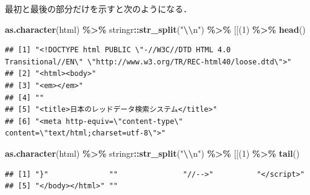 \documentclass[
]{article}
\newenvironment{Shaded}{\begin{snugshade}}{\end{snugshade}}
\newcommand{\AttributeTok}[1]{\textcolor[rgb]{0.13,0.29,0.53}{#1}}
\newcommand{\DecValTok}[1]{\textcolor[rgb]{0.00,0.00,0.81}{#1}}
\newcommand{\FunctionTok}[1]{\textcolor[rgb]{0.13,0.29,0.53}{\textbf{#1}}}
\newcommand{\NormalTok}[1]{#1}
\newcommand{\SpecialCharTok}[1]{\textcolor[rgb]{0.81,0.36,0.00}{\textbf{#1}}}
\newcommand{\StringTok}[1]{\textcolor[rgb]{0.31,0.60,0.02}{#1}}
\begin{document}
最初と最後の部分だけを示すと次のようになる．

\begin{Shaded}
\begin{Highlighting}[]
\FunctionTok{as.character}\NormalTok{(html) }\SpecialCharTok{\%\textgreater{}\%}
\NormalTok{  stringr}\SpecialCharTok{::}\FunctionTok{str\_split}\NormalTok{(}\StringTok{"}\SpecialCharTok{\textbackslash{}\textbackslash{}}\StringTok{n"}\NormalTok{) }\SpecialCharTok{\%\textgreater{}\%}
  \StringTok{\textasciigrave{}}\AttributeTok{[[}\StringTok{\textasciigrave{}}\NormalTok{(}\DecValTok{1}\NormalTok{) }\SpecialCharTok{\%\textgreater{}\%}
  \FunctionTok{head}\NormalTok{()}
\end{Highlighting}
\end{Shaded}

\begin{verbatim}
## [1] "<!DOCTYPE html PUBLIC \"-//W3C//DTD HTML 4.0 Transitional//EN\" \"http://www.w3.org/TR/REC-html40/loose.dtd\">"
## [2] "<html><body>"                                                                                                  
## [3] "<em></em>"                                                                                                     
## [4] ""                                                                                                              
## [5] "<title>日本のレッドデータ検索システム</title>"                                                                 
## [6] "<meta http-equiv=\"content-type\" content=\"text/html;charset=utf-8\">"
\end{verbatim}

\begin{Shaded}
\begin{Highlighting}[]
\FunctionTok{as.character}\NormalTok{(html) }\SpecialCharTok{\%\textgreater{}\%}
\NormalTok{  stringr}\SpecialCharTok{::}\FunctionTok{str\_split}\NormalTok{(}\StringTok{"}\SpecialCharTok{\textbackslash{}\textbackslash{}}\StringTok{n"}\NormalTok{) }\SpecialCharTok{\%\textgreater{}\%}
  \StringTok{\textasciigrave{}}\AttributeTok{[[}\StringTok{\textasciigrave{}}\NormalTok{(}\DecValTok{1}\NormalTok{) }\SpecialCharTok{\%\textgreater{}\%}
  \FunctionTok{tail}\NormalTok{()}
\end{Highlighting}
\end{Shaded}

\begin{verbatim}
## [1] "}"              ""               "//-->"          "</script>"     
## [5] "</body></html>" ""
\end{verbatim}
\end{document}
